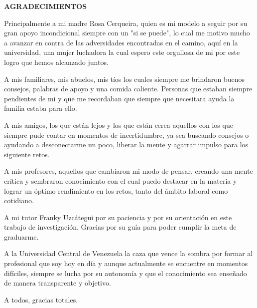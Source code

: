 \begin{center}
	\large{\textbf{AGRADECIMIENTOS}}
\end{center}


\setlength{\parskip}{5mm}
Principalmente a mi madre Rosa Cerqueira, quien es mi modelo a seguir por su gran apoyo incondicional siempre con un "si se puede", lo cual me motivo mucho a avanzar en contra de las adversidades encontradas en el camino, aquí en la universidad, una mujer luchadora la cual espero este orgullosa de mi por este logro que hemos alcanzado juntos.

A mis familiares, mis abuelos, mis tíos los cuales siempre me brindaron buenos consejos, palabras de apoyo y una comida caliente. Personas que estaban siempre pendientes de mi y que me recordaban que siempre que necesitara ayuda la familia estaba para ello.

A mis amigos, los que están lejos y los que están cerca aquellos con los que siempre pude contar en momentos de incertidumbre, ya sea buscando consejos o ayudando a desconectarme un poco, liberar la mente y agarrar impulso para los siguiente retos.

A mis profesores, aquellos que cambiaron mi modo de pensar, creando una mente crítica y sembraron conocimiento con el cual puedo destacar en la materia y lograr un óptimo rendimiento en los retos, tanto del ámbito laboral como cotidiano.

A mi tutor Franky Uzcátegui por su paciencia y por su orientación en este trabajo de investigación. Gracias por su guía para poder cumplir la meta de graduarme.  

A la Universidad Central de Venezuela la caza que vence la sombra por formar al profesional que soy hoy en día y aunque actualmente se encuentre en momentos difíciles, siempre se lucha por su autonomía y que el conocimiento sea enseñado de manera transparente y objetivo.
\begin{flushright}
A todos, gracias totales.
\end{flushright}
\setlength{\parskip}{0mm}